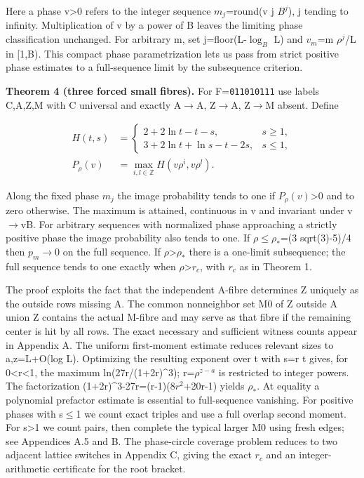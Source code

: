 \documentclass[11pt]{article}
\begin{document}
Here a phase v>0 refers to the integer sequence $m_{j}$=round(v j $B^{j}$), j tending to infinity. Multiplication of v by a power of B leaves the limiting phase classification unchanged. For arbitrary m, set j=floor(L-$\log_B$ L) and $v_{m}$=m $\rho^{j}$/L in [1,B). This compact phase parametrization lets us pass from strict positive phase estimates to a full-sequence limit by the subsequence criterion.

\textbf{Theorem 4 (three forced small fibres).} For F=\texttt{011010111} use labels C,A,Z,M with C universal and exactly A\ensuremath{\to}A, Z\ensuremath{\to}A, Z\ensuremath{\to}M absent. Define

\[
\begin{aligned}
H(t,s)&=\begin{cases}2+2\ln t-t-s,&s\geq1,\\3+2\ln t+\ln s-t-2s,&s\leq1,\end{cases}\\
P_\rho(v)&=\max_{i,l\in\mathbb Z}H(v\rho^i,v\rho^l).
\end{aligned}
\]

Along the fixed phase $m_{j}$ the image probability tends to one if $P_\rho(v)$>0 and to zero otherwise. The maximum is attained, continuous in v and invariant under v\ensuremath{\to}vB. For arbitrary sequences with normalized phase approaching a strictly positive phase the image probability also tends to one. If $\rho$\ensuremath{\leq}$\rho_{*}$=(3 sqrt(3)-5)/4 then $p_m$\ensuremath{\to}0 on the full sequence. If $\rho$>$\rho_{*}$ there is a one-limit subsequence; the full sequence tends to one exactly when $\rho$>$r_{c}$, with $r_{c}$ as in Theorem 1.

The proof exploits the fact that the independent A-fibre determines Z uniquely as the outside rows missing A. The common nonneighbor set M0 of Z outside A union Z contains the actual M-fibre and may serve as that fibre if the remaining center is hit by all rows. The exact necessary and sufficient witness counts appear in Appendix A. The uniform first-moment estimate reduces relevant sizes to a,z=L+O(log L). Optimizing the resulting exponent over t with s=r t gives, for 0<r<1, the maximum ln(27r/(1+2r)\textasciicircum{}3); r=$\rho^{z-a}$ is restricted to integer powers. The factorization (1+2r)\textasciicircum{}3-27r=(r-1)($8r^{2}$+20r-1) yields $\rho_{*}$. At equality a polynomial prefactor estimate is essential to full-sequence vanishing. For positive phases with s\ensuremath{\leq}1 we count exact triples and use a full overlap second moment. For s>1 we count pairs, then complete the typical larger M0 using fresh edges; see Appendices A.5 and B. The phase-circle coverage problem reduces to two adjacent lattice switches in Appendix C, giving the exact $r_{c}$ and an integer-arithmetic certificate for the root bracket.
\end{document}

